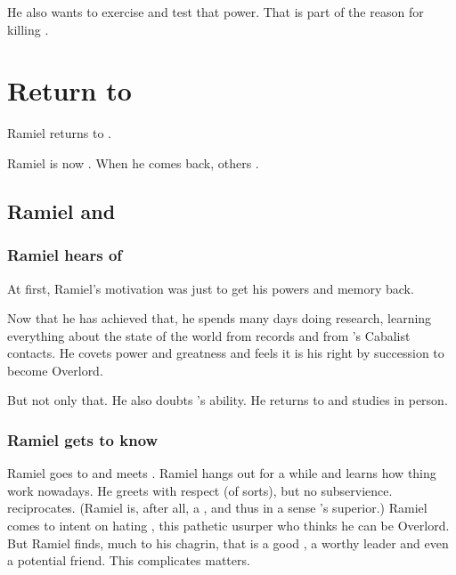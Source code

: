 He also wants to exercise and test that power. 
That is part of the reason for killing \Gilchad. 















\section{Return to \Mystraacht}
Ramiel returns to \Mystraacht. 


Ramiel is now .
When he comes back, others . 





\subsection{Ramiel and \Dasteron}





\subsubsection{Ramiel hears of \Dasteron}
At first, Ramiel's motivation was just to get his powers and memory back. 

Now that he has achieved that, he spends many days doing research, learning everything about the state of the world from records and from \Cishiel's Cabalist contacts.
He covets power and greatness and feels it is his right by succession to become Overlord.

But not only that.
He also doubts \Dasteron's ability.
He returns to \Mystraacht and studies \Dasteron in person.





\subsubsection{Ramiel gets to know \Dasteron}
Ramiel goes to \Mystraacht and meets \Dasteron.
Ramiel hangs out for a while and learns how thing work nowadays.
He greets \Dasteron with respect (of sorts), but no subservience.
\Dasteron reciprocates. (Ramiel is, after all, a \sathariah, and thus in a sense \Dasteron's superior.)
Ramiel comes to \Mystraacht intent on hating \Dasteron, this pathetic usurper who thinks he can be Overlord.
But Ramiel finds, much to his chagrin, that \Dasteron is a good \resphan, a worthy leader and even a potential friend.
This complicates matters.





